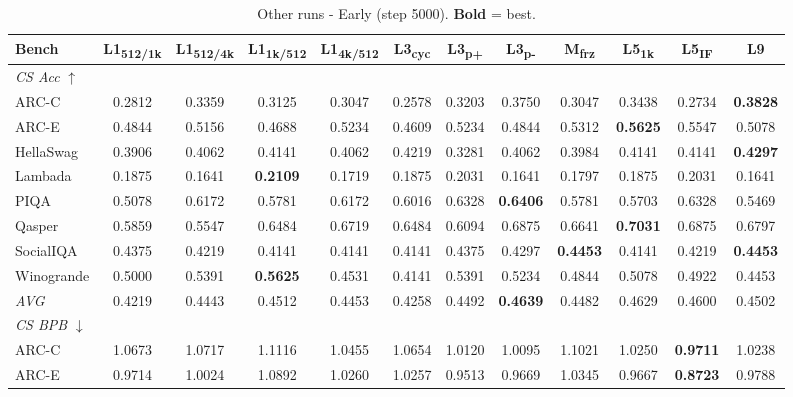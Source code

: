 \begin{table}[htbp]
\centering
\setlength{\tabcolsep}{2.5pt}
\small
\caption{Other runs - Early (step 5000). \textbf{Bold} = best.}
\label{tab:other_early}
\begin{tabular}{lccccccccccc}
\toprule
Bench & L1\textsubscript{512/1k} & L1\textsubscript{512/4k} & L1\textsubscript{1k/512} & L1\textsubscript{4k/512} & L3\textsubscript{cyc} & L3\textsubscript{p+} & L3\textsubscript{p-} & M\textsubscript{frz} & L5\textsubscript{1k} & L5\textsubscript{IF} & L9 \\
\midrule
\multicolumn{12}{l}{\textit{CS Acc} $\uparrow$} \\
ARC-C & 0.2812 & 0.3359 & 0.3125 & 0.3047 & 0.2578 & 0.3203 & 0.3750 & 0.3047 & 0.3438 & 0.2734 & \textbf{0.3828} \\
ARC-E & 0.4844 & 0.5156 & 0.4688 & 0.5234 & 0.4609 & 0.5234 & 0.4844 & 0.5312 & \textbf{0.5625} & 0.5547 & 0.5078 \\
HellaSwag & 0.3906 & 0.4062 & 0.4141 & 0.4062 & 0.4219 & 0.3281 & 0.4062 & 0.3984 & 0.4141 & 0.4141 & \textbf{0.4297} \\
Lambada & 0.1875 & 0.1641 & \textbf{0.2109} & 0.1719 & 0.1875 & 0.2031 & 0.1641 & 0.1797 & 0.1875 & 0.2031 & 0.1641 \\
PIQA & 0.5078 & 0.6172 & 0.5781 & 0.6172 & 0.6016 & 0.6328 & \textbf{0.6406} & 0.5781 & 0.5703 & 0.6328 & 0.5469 \\
Qasper & 0.5859 & 0.5547 & 0.6484 & 0.6719 & 0.6484 & 0.6094 & 0.6875 & 0.6641 & \textbf{0.7031} & 0.6875 & 0.6797 \\
SocialIQA & 0.4375 & 0.4219 & 0.4141 & 0.4141 & 0.4141 & 0.4375 & 0.4297 & \textbf{0.4453} & 0.4141 & 0.4219 & \textbf{0.4453} \\
Winogrande & 0.5000 & 0.5391 & \textbf{0.5625} & 0.4531 & 0.4141 & 0.5391 & 0.5234 & 0.4844 & 0.5078 & 0.4922 & 0.4453 \\
\textit{AVG} & 0.4219 & 0.4443 & 0.4512 & 0.4453 & 0.4258 & 0.4492 & \textbf{0.4639} & 0.4482 & 0.4629 & 0.4600 & 0.4502 \\
\midrule
\multicolumn{12}{l}{\textit{CS BPB} $\downarrow$} \\
ARC-C & 1.0673 & 1.0717 & 1.1116 & 1.0455 & 1.0654 & 1.0120 & 1.0095 & 1.1021 & 1.0250 & \textbf{0.9711} & 1.0238 \\
ARC-E & 0.9714 & 1.0024 & 1.0892 & 1.0260 & 1.0257 & 0.9513 & 0.9669 & 1.0345 & 0.9667 & \textbf{0.8723} & 0.9788 \\

\end{tabular}
\end{table}
